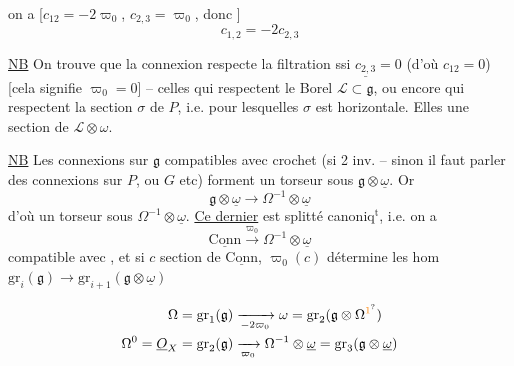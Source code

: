 on a [$c_{12}=-2\varpi_0$, $c_{2,3}=\varpi_0$, donc ]
\[ \boxed{c_{1,2}=-2c_{2,3}} \]

\uline{NB} On trouve que la connexion respecte la filtration ssi $\underline{c_{2,3}}=0$ (d'où $c_{12}=0$) [cela signifie $\varpi_0=0$] --  celles qui respectent le Borel $\mathscr L\subset\mathfrak g$, ou encore  qui respectent la section $\sigma$ de $P$, i.e. pour lesquelles $\sigma$ est horizontale. Elles   une section de $\mathscr L\otimes\omega$. 


\uline{NB} Les connexions sur $\mathfrak g$ compatibles avec crochet  (si 2 inv. -- sinon il faut parler des connexions sur $P$, ou $G$ etc) forment un torseur sous $\mathfrak g\otimes\underline\omega$. Or
\[ \mathfrak g\otimes\underline\omega\longrightarrow \Omega^{-1}\otimes\underline\omega \]
d'où un torseur sous $\Omega^{-1}\otimes\underline\omega$. \uline{Ce dernier} est splitté canoniq$^{\mathrm{t}}$, i.e. on a
\[ \underline{\mathrm{Conn}}\xrightarrow{\varpi_0}\Omega^{-1}\otimes\underline\omega \]
compatible avec , et si $c$ section de $\underline{\mathrm{Conn}}$, $\varpi_0(c)$ détermine les hom $\mathrm{gr}_i(\mathfrak g)\to\mathrm{gr}_{i+1}(\mathfrak g\otimes\underline\omega)$

\[ \begin{aligned}
 \Omega=\mathrm{gr}_1(\mathfrak g)&\xrightarrow[-2\varpi_0]{}\omega=\mathrm{gr}_2(\mathfrak g\otimes\Omega^{\unsure{1}})\\
 \Omega^0=\underline O_X=\mathrm{gr}_2(\mathfrak g)&\xrightarrow[\varpi_0]{}\Omega^{-1}\otimes\underline\omega=\mathrm{gr}_3(\mathfrak g\otimes\underline\omega)
 \end{aligned} \]

